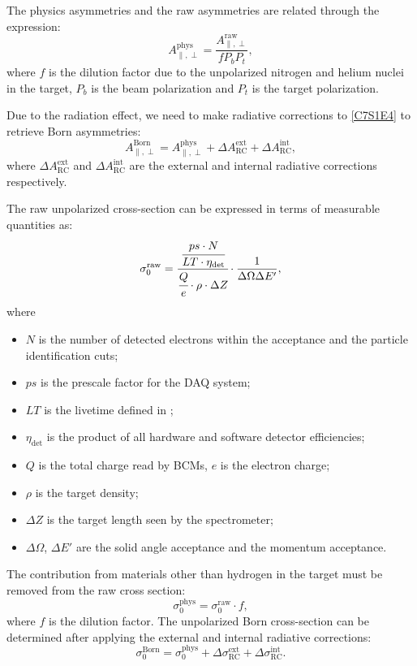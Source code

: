 The physics asymmetries and the raw asymmetries are related through the expression:
\begin{equation} \label{C7S1E4}
A_{\parallel,\perp}^{\mathrm{phys}}=\frac{A_{\parallel,\perp}^{\mathrm{raw}}}{fP_bP_t},
\end{equation}
where $f$ is the dilution factor due to the unpolarized nitrogen and helium nuclei in the target, $P_b$ is the beam polarization and $P_t$ is the target polarization.

Due to the radiation effect, we need to make radiative corrections to \cref{C7S1E4} to retrieve Born asymmetries:
\begin{equation} \label{C7S1E5}
A_{\parallel,\perp}^{\mathrm{Born}}=A_{\parallel,\perp}^{\mathrm{phys}}+\Delta A_{\mathrm{RC}}^{\mathrm{ext}}+\Delta A_{\mathrm{RC}}^{\mathrm{int}},
\end{equation}
where $\Delta A_{\mathrm{RC}}^{\mathrm{ext}}$ and $\Delta A_{\mathrm{RC}}^{\mathrm{int}}$ are the external and internal radiative corrections respectively.

The raw unpolarized cross-section can be expressed in terms of measurable quantities as:
\begin{equation} \label{C7S1E6}
\sigma_0^{\mathrm{raw}} = \cfrac{\cfrac{ps\cdot N}{LT\cdot\eta_{\mathrm{det}}}}{\cfrac{Q}{e}\cdot\rho\cdot\Delta Z }\cdot\frac{1}{\Delta\Omega\Delta E'},
\end{equation}
where
\begin{itemize}[parsep=0pt]
\item $N$ is the number of detected electrons within the acceptance and the particle identification cuts;
\item $ps$ is the prescale factor for the DAQ system;
\item $LT$ is the livetime defined in ;
\item $\eta_{\mathrm{det}}$ is the product of all hardware and software detector efficiencies;
\item $Q$ is the total charge read by BCMs, $e$ is the electron charge;
\item $\rho$ is the target density;
\item $\Delta Z$ is the target length seen by the spectrometer;
\item $\Delta\Omega$, $\Delta E'$ are the solid angle acceptance and the momentum acceptance.
\end{itemize}

The contribution from materials other than hydrogen in the target must be removed from the raw cross section:
\begin{equation} \label{C7S1E7}
\sigma_0^{\mathrm{phys}} = \sigma_0^{\mathrm{raw}}\cdot f,
\end{equation}
where $f$ is the dilution factor. The unpolarized Born cross-section can be determined after applying the external and internal radiative corrections:
\begin{equation} \label{C7S1E8}
\sigma_0^{\mathrm{Born}} = \sigma_0^{\mathrm{phys}}+\Delta \sigma_{\mathrm{RC}}^{\mathrm{ext}}+\Delta \sigma_{\mathrm{RC}}^{\mathrm{int}}.
\end{equation}

